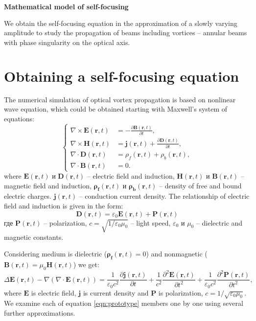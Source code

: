 \documentclass[a4paper, 12pt]{article}
\begin{document}
\begin{center}
\Huge{\textbf{Mathematical model of self-focusing}}
\end{center}

We obtain the self-focusing equation in the approximation of a slowly varying amplitude to study the propagation of beams including vortices -- annular beams with phase singularity on the optical axis.

\section{Obtaining a self-focusing equation}

The numerical simulation of optical vortex propagation is based on nonlinear wave equation, which could be obtained starting with Maxwell's system of equations:
\begin{equation}
\label{eqn:maxwell}
\left\{
\begin{aligned}
\nabla \times \mathbf{E}(\mathbf{r}, t) &= -\frac{\partial \mathbf{B}(\mathbf{r}, t)}{\partial t},\\
\nabla \times \mathbf{H}(\mathbf{r}, t) &= \mathbf{j}(\mathbf{r}, t) + \frac{\partial \mathbf{D}(\mathbf{r}, t)}{\partial t},\\[0.2cm]
\nabla \cdot \mathbf{D}(\mathbf{r}, t) &= \rho_f (\mathbf{r}, t) + \rho_b (\mathbf{r}, t), \\[0.3cm]
\nabla \cdot \mathbf{B}(\mathbf{r}, t) &= 0.
\end{aligned}
\right.
\end{equation}
where $\mathbf{E}(\mathbf{r}, t)$ и $\mathbf{D}(\mathbf{r}, t)$ -- electric field and induction, $\mathbf{H}(\mathbf{r}, t)$ и $\mathbf{B}(\mathbf{r}, t)$ -- magnetic field and induction, $\mathbf{\rho_f}(\mathbf{r}, t)$ и $\mathbf{\rho_b}(\mathbf{r}, t)$ -- density of free and bound electric charges. $\mathbf{j}(\mathbf{r}, t)$ -- conduction current density. The relationship of electric field and induction is given in the form:
\begin{equation}
\label{eqn:D}
\mathbf{D}(\mathbf{r}, t) = \varepsilon_0 \mathbf{E}(\mathbf{r}, t) + \mathbf{P}(\mathbf{r}, t)
\end{equation}
где $\mathbf{P}(\mathbf{r}, t)$ -- polarization, $c = \sqrt{1 / \varepsilon_0 \mu_0}$ -- light speed, $\varepsilon_0$ и $\mu_0$ -- dielectric and magnetic constants.

Considering medium is dielectric ($\mathbf{\rho_f}(\mathbf{r}, t) = 0$) and nonmagnetic ($\mathbf{B}(\mathbf{r}, t) = \mu_0 \mathbf{H}(\mathbf{r}, t)$) 
we get:
\begin{equation}
\label{eqn:prototype}
\Delta \mathbf{E}(\mathbf{r}, t) - \nabla (\nabla \cdot \mathbf{E}(\mathbf{r}, t)) =  \frac1{\varepsilon_0 c^2} \frac{\partial \mathbf{j}(\mathbf{r}, t)}{\partial t} + \frac1{c^2} \frac{\partial^2 \mathbf{E}(\mathbf{r}, t)}{\partial t^2} + \frac1{\varepsilon_0 c^2} \frac{\partial^2 \mathbf{P}(\mathbf{r}, t)}{\partial t^2},
\end{equation}
where $\mathbf{E}$ is electric field, $\mathbf{j}$ is current density and $\mathbf{P}$ is polarization, $c=1/\sqrt{\varepsilon_0 \mu_0}$. We examine each of equation \eqref{eqn:prototype} members one by one using several further approximations. 
\end{document}
